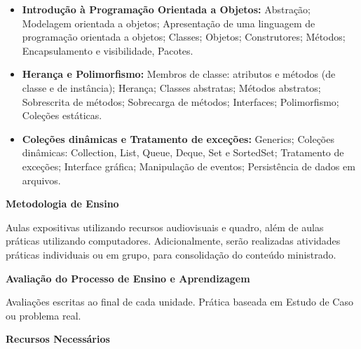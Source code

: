 \begin{itemize}

 \item \textbf{Introdução à Programação Orientada a Objetos:} Abstração; Modelagem orientada a objetos; Apresentação de uma linguagem de programação orientada a objetos;	Classes; Objetos; Construtores; Métodos; Encapsulamento e visibilidade, Pacotes.


 \item \textbf{Herança e Polimorfismo:} Membros de classe: atributos e métodos (de classe e de instância); Herança;	Classes abstratas; Métodos abstratos; Sobrescrita de métodos; Sobrecarga de métodos; Interfaces;	Polimorfismo; Coleções estáticas.

 \item \textbf{Coleções dinâmicas e Tratamento de exceções:} Generics; Coleções dinâmicas: Collection, List, Queue, Deque, Set e SortedSet; Tratamento de exceções; Interface gráfica; Manipulação de eventos; Persistência de dados em arquivos.

\end{itemize}

\begin{snugshade}\begin{center}\textbf{
    Metodologia de Ensino
}\end{center}\end{snugshade}

\noindent
      Aulas expositivas utilizando recursos audiovisuais e quadro, além de aulas práticas utilizando computadores. Adicionalmente, serão realizadas atividades práticas individuais ou em grupo, para consolidação do conteúdo ministrado.

\begin{snugshade}\begin{center}\textbf{
    Avaliação do Processo de Ensino e Aprendizagem
}\end{center}\end{snugshade}

\noindent
  Avaliações escritas ao final de cada unidade. Prática baseada em Estudo de Caso ou problema real.
  
\begin{snugshade}\begin{center}\textbf{
    Recursos Necessários
    \vphantom{q} %
}\end{center}\end{snugshade}

